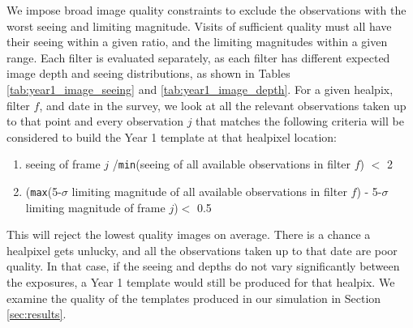 \documentclass[preprintm,linenumbers]{aastex631}
\begin{document}
	We impose broad image quality constraints to exclude the observations with the worst seeing and limiting magnitude. 
    Visits of sufficient quality must all have their seeing within a given ratio, and the limiting magnitudes within a given range.
 Each filter is evaluated separately, as each filter has different expected image depth and seeing distributions, as shown in Tables \ref{tab:year1_image_seeing} and  \ref{tab:year1_image_depth}. 
	For a given healpix, filter $f$, and date in the survey, we look at all the relevant observations taken up to that point and  every observation $j$ that matches the following criteria will be considered to build the Year 1 template at that healpixel location: 
	\begin{enumerate}
		\item seeing of frame $j$ /\texttt{min}(seeing of all available observations in filter $f$) $<$ 2
		\item (\texttt{max}(5-$\sigma$ limiting magnitude of all available observations in filter $f$) -  5-$\sigma$ limiting magnitude of frame $j$)$<$ 0.5
	\end{enumerate}
	This will reject the lowest quality images on average. There is a chance a healpixel gets unlucky, and all the observations taken up to that date are poor quality. In that case, if the seeing and depths do not vary significantly between the exposures, a Year 1 template would still be produced for that healpix. We examine the quality of the templates produced in our simulation in Section \ref{sec:results}.
	
\end{document}
